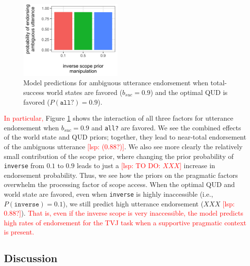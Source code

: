 \documentclass[preprint,authoryear]{elsarticle}\frenchspacing
\newcommand{\lsp}[1]{\textcolor{red}{[lsp: #1]}}
\newcommand{\lp}[1]{\textcolor{red}{#1}} %
\begin{document}
\begin{figure}[ht]
\centering
\includegraphics[height=1.55in]{every-not-pragmatic-plot.png}
\vspace{-5pt}
\caption{Model predictions for ambiguous utterance endorsement when total-success world states are favored ($b_{suc}=0.9$) and the optimal QUD is favored ($P(\texttt{all?}) = 0.9$).}
\label{fig:interaction}
\end{figure}


\lp{In particular,} Figure \ref{fig:interaction} shows the interaction of all three factors for utterance endorsement when $b_{suc}=0.9$ and \texttt{all?} are favored. We see the combined effects of the world state and QUD priors; together, they lead to near-total endorsement of the ambiguous utterance \lsp{(0.88?)}. We also see more clearly the relatively small contribution of the scope prior, where changing the prior probability of \texttt{inverse} from $0.1$ to $0.9$ leads to just a \lsp{TO DO: $XXX$} increase in endorsement probability.  Thus, we see how the priors on the pragmatic  factors overwhelm the processing factor of scope access. When the optimal QUD and world state are favored, even when \texttt{inverse} is highly inaccessible (i.e., $P(\texttt{inverse}) = 0.1$), we still predict high utterance endorsement ($XXX$ \lsp{0.88?}).
\lp{That is, even if the inverse scope is very inaccessible, the model predicts high rates of endorsement for the TVJ task when a supportive pragmatic context is present.}

\subsection{Discussion}
\end{document}
